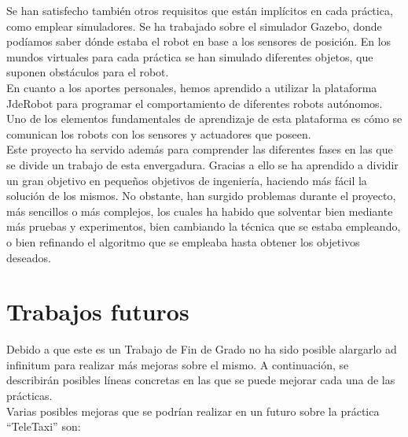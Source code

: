 Se han satisfecho también otros requisitos que están implícitos en cada práctica, como emplear simuladores. Se ha trabajado sobre el simulador Gazebo, donde podíamos saber dónde estaba el robot en base a los sensores de posición. En los mundos virtuales para cada práctica se han simulado diferentes objetos, que suponen obstáculos para el robot.\\

En cuanto a los aportes personales, hemos aprendido a utilizar la plataforma JdeRobot para programar el comportamiento de diferentes robots autónomos. Uno de los elementos fundamentales de aprendizaje de esta plataforma es cómo se comunican los robots con los sensores y actuadores que poseen. \\

Este proyecto ha servido además para comprender las diferentes fases en las que se divide un trabajo de esta envergadura. Gracias a ello se ha aprendido a dividir un gran objetivo en pequeños objetivos de ingeniería, haciendo más fácil la solución de los mismos. No obstante, han surgido problemas durante el proyecto, más sencillos o más complejos, los cuales ha habido que solventar bien mediante más pruebas y experimentos, bien cambiando la técnica que se estaba empleando, o bien refinando el algoritmo que se empleaba hasta obtener los objetivos deseados.

\section{Trabajos futuros}
Debido a que este es un Trabajo de Fin de Grado no ha sido posible alargarlo ad infinitum para realizar más mejoras sobre el mismo. A continuación, se describirán posibles líneas concretas en las que se puede mejorar cada una de las prácticas.\\

Varias posibles mejoras que se podrían realizar en un futuro sobre la práctica ``TeleTaxi'' son:

